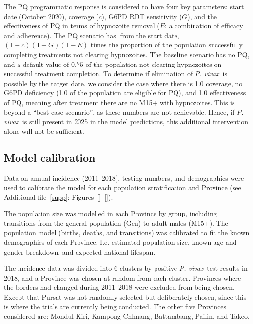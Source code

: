 \documentclass[doublespacing]{bmcart}
\newcommand{\pv}{\textit{P. vivax}}
\begin{document}
The PQ programmatic response is considered to have four key parameters: start date (October 2020), coverage ($c$), G6PD RDT sensitivity ($G$), and the effectiveness of PQ in terms of hypnozoite removal ($E$: a combination of efficacy and adherence). The PQ scenario has, from the start date, $(1-c)(1-G)(1-E)$ times the proportion of the population successfully completing treatments not clearing hypnozoites. The baseline scenario has no PQ, and a default value of $0.75$ of the population not clearing hypnozoites on successful treatment completion. To determine if elimination of \pv~is possible by the target date, we consider the case where there is 1.0 coverage, no G6PD deficiency (1.0 of the population are eligible for PQ), and 1.0 effectiveness of PQ, meaning after treatment there are no M15+ with hypnozoites. This is beyond a ``best case scenario'', as these numbers are not achievable. Hence, if \pv~is still present in 2025 in the model predictions, this additional intervention alone will not be sufficient.  

\subsection*{Model calibration} \label{sec:calibration} %

Data on annual incidence (2011--2018), testing numbers, and demographics were used to calibrate the model for each population stratification and Province (see Additional file~\ref{supp}: Figures~\ref{}--\ref{}). 

The population size was modelled in each Province by group, including transitions from the general population (Gen) to adult males (M15+). The population model (births, deaths, and transitions) was calibrated to fit the known demographics of each Province. I.e. estimated population size, known age and gender breakdown, and expected national lifespan.

The incidence data was divided into 6 clusters by positive \pv~test results in 2018, and a Province was chosen at random from each cluster. Provinces where the borders had changed during 2011--2018 were excluded from being chosen. Except that Pursat was not randomly selected but deliberately chosen, since this is where the trials are currently being conducted. The other five Provinces considered are: Mondul Kiri, Kampong Chhnang, Battambang, Pailin, and Takeo. 
\end{document}

